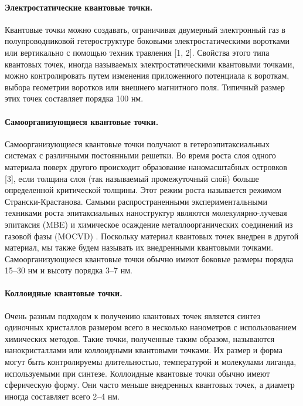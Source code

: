 \documentclass[a4paper,14pt]{extarticle}
\begin{document}
\paragraph{Электростатические квантовые точки.} Квантовые точки можно создавать, ограничивая двумерный электронный газ в полупроводниковой гетероструктуре боковыми электростатическими воротками или вертикально с помощью техник травления [1, 2]. Свойства этого типа квантовых точек, иногда называемых электростатическими квантовыми точками, можно контролировать путем изменения приложенного потенциала к вороткам, выбора геометрии воротков или внешнего магнитного поля. Типичный размер этих точек составляет порядка 100 нм.\cite{vukmirovic}

\paragraph{Самоорганизующиеся квантовые точки.} Самоорганизующиеся квантовые точки получают в гетероэпитаксиальных системах с различными постоянными решетки. Во время роста слоя одного материала поверх другого происходит образование наномасштабных островков [3], если толщина слоя (так называемый промежуточный слой) больше определенной критической толщины. Этот режим роста называется режимом Странски-Крастанова. Самыми распространенными экспериментальными техниками роста эпитаксиальных наноструктур являются молекулярно-лучевая эпитаксия (MBE) и химическое осаждение металлоорганических соединений из газовой фазы (MOCVD) . Поскольку материал квантовых точек внедрен в другой материал, мы также будем называть их внедренными квантовыми точками. Самоорганизующиеся квантовые точки обычно имеют боковые размеры порядка 15–30 нм и высоту порядка 3–7 нм.\cite{vukmirovic}

\paragraph{Коллоидные квантовые точки.} Очень разным подходом к получению квантовых точек является синтез одиночных кристаллов размером всего в несколько нанометров с использованием химических методов. Такие точки, полученные таким образом, называются нанокристаллами или коллоидными квантовыми точками. \cite{vukmirovic} Их размер и форма могут быть контролируемы длительностью, температурой и молекулами лиганда, используемыми при синтезе. Коллоидные квантовые точки обычно имеют сферическую форму. Они часто меньше внедренных квантовых точек, а диаметр иногда составляет всего 2–4 нм.
\end{document}

